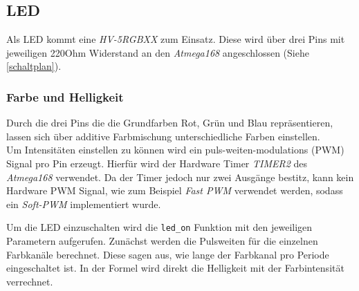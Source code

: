 \subsection{LED}
    Als LED kommt eine \textit{HV-5RGBXX} zum Einsatz. Diese wird über drei Pins
    mit jeweiligen 220Ohm Widerstand an den \textit{Atmega168} angeschlossen
    (Siehe \ref{schaltplan}).

\subsubsection{Farbe und Helligkeit}
    Durch die drei Pins die die Grundfarben Rot, Grün und Blau repräsentieren,
    lassen sich über additive Farbmischung unterschiedliche Farben einstellen.
    \\
    Um Intensitäten einstellen zu können wird ein puls-weiten-modulations (PWM)
    Signal pro Pin erzeugt. Hierfür wird der Hardware Timer \textit{TIMER2} des
    \textit{Atmega168} verwendet. Da der Timer jedoch nur zwei Ausgänge bestitz, kann
    kein Hardware PWM Signal, wie zum Beispiel \textit{Fast PWM} verwendet werden,
    sodass ein \textit{Soft-PWM} implementiert wurde.
    
    
    Um die LED einzuschalten wird die \texttt{led\_on} Funktion mit den
    jeweiligen Parametern aufgerufen. Zunächst werden die
    Pulsweiten für die einzelnen Farbkanäle berechnet. Diese sagen aus, wie 
    lange der Farbkanal pro Periode eingeschaltet ist. In der Formel wird direkt
    die Helligkeit mit der Farbintensität verrechnet.

